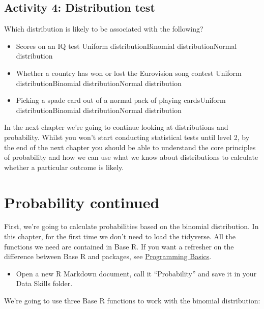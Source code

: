 \documentclass[
  oneside]{book}
\providecommand{\tightlist}{%
  \setlength{\itemsep}{0pt}\setlength{\parskip}{0pt}}
\begin{document}
\hypertarget{activity-4-distribution-test}{%
\section{Activity 4: Distribution test}\label{activity-4-distribution-test}}

Which distribution is likely to be associated with the following?

\begin{itemize}
\tightlist
\item
  Scores on an IQ test Uniform distributionBinomial distributionNormal distribution
\item
  Whether a country has won or lost the Eurovision song contest Uniform distributionBinomial distributionNormal distribution
\item
  Picking a spade card out of a normal pack of playing cardsUniform distributionBinomial distributionNormal distribution
\end{itemize}

In the next chapter we're going to continue looking at distributions and probability. Whilst you won't start conducting statistical tests until level 2, by the end of the next chapter you should be able to understand the core principles of probability and how we can use what we know about distributions to calculate whether a particular outcome is likely.

\hypertarget{probability-continued}{%
\chapter{Probability continued}\label{probability-continued}}

First, we're going to calculate probabilities based on the binomial distribution. In this chapter, for the first time we don't need to load the tidyverse. All the functions we need are contained in Base R. If you want a refresher on the difference between Base R and packages, see \href{https://psyteachr.github.io/ug1-practical/programming-basics.html\#packages}{Programming Basics}.

\begin{itemize}
\tightlist
\item
  Open a new R Markdown document, call it ``Probability'' and save it in your Data Skills folder.
\end{itemize}

We're going to use three Base R functions to work with the binomial distribution:
\end{document}
